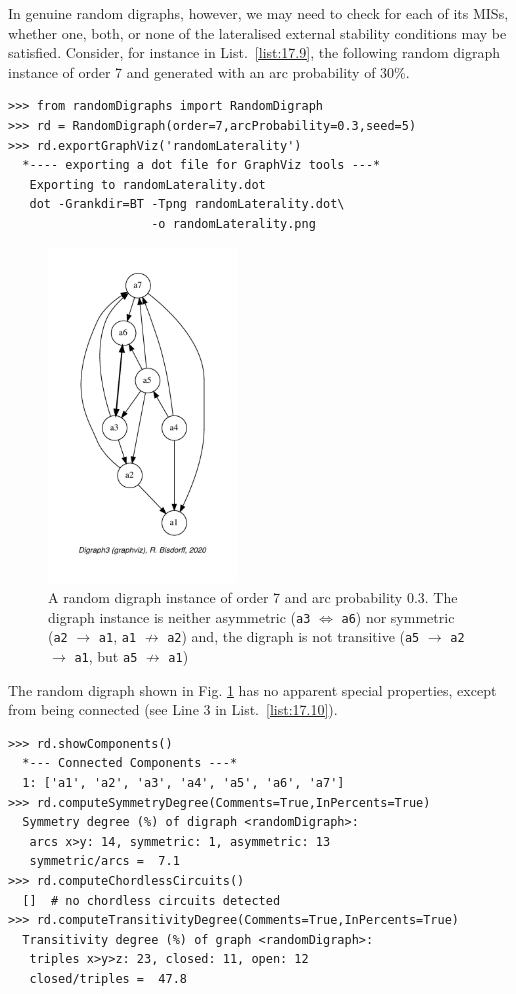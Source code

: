 In genuine random digraphs, however, we may need to check for each of its MISs, whether one, both, or none of the lateralised external stability conditions may be satisfied. Consider, for instance in List.~\vref{list:17.9}, the following random digraph instance of order 7 and generated with an arc probability of $30\%$. 
\begin{lstlisting}[caption={Generating a random digraph \texttt{rd} of order 7 and arc probability 0.3},label=list:17.9]
>>> from randomDigraphs import RandomDigraph
>>> rd = RandomDigraph(order=7,arcProbability=0.3,seed=5)
>>> rd.exportGraphViz('randomLaterality')
  *---- exporting a dot file for GraphViz tools ---*
   Exporting to randomLaterality.dot
   dot -Grankdir=BT -Tpng randomLaterality.dot\
                    -o randomLaterality.png
\end{lstlisting}
\begin{figure}[h]
\sidecaption[t]
\includegraphics[width=5cm]{Figures/17-4-randomLaterality.pdf}
\caption{A random digraph instance of order 7 and arc probability 0.3. The digraph instance is neither asymmetric (\texttt{a3} $\Leftrightarrow$ \texttt{a6}) nor symmetric (\texttt{a2} $\rightarrow$ \texttt{a1}, \texttt{a1} $\not\rightarrow$ \texttt{a2}) and, the digraph is not transitive (\texttt{a5} $\rightarrow$ \texttt{a2} $\rightarrow$ \texttt{a1}, but \texttt{a5} $\not\rightarrow$ \texttt{a1})} 
\label{fig:17.4}       %
\end{figure}
The random digraph shown in Fig. \ref{fig:17.4} has no apparent special properties, except from being connected (see Line 3 in List.~\vref{list:17.10}).
\begin{lstlisting}[caption={Inspecting the properties of random digraph \texttt{rd}},label=list:17.10]
>>> rd.showComponents()
  *--- Connected Components ---*
  1: ['a1', 'a2', 'a3', 'a4', 'a5', 'a6', 'a7']
>>> rd.computeSymmetryDegree(Comments=True,InPercents=True)
  Symmetry degree (%) of digraph <randomDigraph>:
   arcs x>y: 14, symmetric: 1, asymmetric: 13
   symmetric/arcs =  7.1
>>> rd.computeChordlessCircuits()
  []  # no chordless circuits detected
>>> rd.computeTransitivityDegree(Comments=True,InPercents=True)
  Transitivity degree (%) of graph <randomDigraph>:
   triples x>y>z: 23, closed: 11, open: 12
   closed/triples =  47.8
\end{lstlisting}
